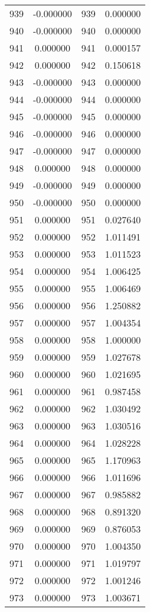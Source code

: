 \documentclass[12pt]{article}
\begin{document}
\begin{longtable}{@{}cccc@{}}
939 & -0.000000 & 939 & 0.000000 \\
940 & -0.000000 & 940 & 0.000000 \\
941 & 0.000000 & 941 & 0.000157 \\
942 & 0.000000 & 942 & 0.150618 \\
943 & -0.000000 & 943 & 0.000000 \\
944 & -0.000000 & 944 & 0.000000 \\
945 & -0.000000 & 945 & 0.000000 \\
946 & -0.000000 & 946 & 0.000000 \\
947 & -0.000000 & 947 & 0.000000 \\
948 & 0.000000 & 948 & 0.000000 \\
949 & -0.000000 & 949 & 0.000000 \\
950 & -0.000000 & 950 & 0.000000 \\
951 & 0.000000 & 951 & 0.027640 \\
952 & 0.000000 & 952 & 1.011491 \\
953 & 0.000000 & 953 & 1.011523 \\
954 & 0.000000 & 954 & 1.006425 \\
955 & 0.000000 & 955 & 1.006469 \\
956 & 0.000000 & 956 & 1.250882 \\
957 & 0.000000 & 957 & 1.004354 \\
958 & 0.000000 & 958 & 1.000000 \\
959 & 0.000000 & 959 & 1.027678 \\
960 & 0.000000 & 960 & 1.021695 \\
961 & 0.000000 & 961 & 0.987458 \\
962 & 0.000000 & 962 & 1.030492 \\
963 & 0.000000 & 963 & 1.030516 \\
964 & 0.000000 & 964 & 1.028228 \\
965 & 0.000000 & 965 & 1.170963 \\
966 & 0.000000 & 966 & 1.011696 \\
967 & 0.000000 & 967 & 0.985882 \\
968 & 0.000000 & 968 & 0.891320 \\
969 & 0.000000 & 969 & 0.876053 \\
970 & 0.000000 & 970 & 1.004350 \\
971 & 0.000000 & 971 & 1.019797 \\
972 & 0.000000 & 972 & 1.001246 \\
973 & 0.000000 & 973 & 1.003671 \\

\end{longtable}
\end{document}
